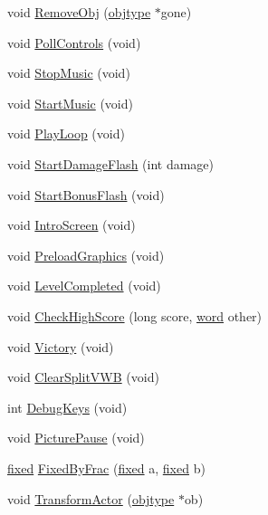 \begin{DoxyCompactItemize}
\item 
void \hyperlink{WL__DEF_8H_a2cf5a059e3bf9f094eb8427afbd49664}{RemoveObj} (\hyperlink{structobjstruct}{objtype} $\ast$gone)
\item 
void \hyperlink{WL__DEF_8H_a15ba9210e22ebca4139dd64d5ede0d05}{PollControls} (void)
\item 
void \hyperlink{WL__DEF_8H_a4f0b9aceb236c59d54712be5ace9e96e}{StopMusic} (void)
\item 
void \hyperlink{WL__DEF_8H_a3374c0ac5e4769e46cebf74f4180dca4}{StartMusic} (void)
\item 
void \hyperlink{WL__DEF_8H_a1093a19e7a1263f20a026e662db7121f}{PlayLoop} (void)
\item 
void \hyperlink{WL__DEF_8H_a9d82bd76126e466b5d9fa28eea3d00f1}{StartDamageFlash} (int damage)
\item 
void \hyperlink{WL__DEF_8H_a18616827acc24f2c2b1b9a77326bc024}{StartBonusFlash} (void)
\item 
void \hyperlink{WL__DEF_8H_a98260bc22d24f0075ec75a375a865b1d}{IntroScreen} (void)
\item 
void \hyperlink{WL__DEF_8H_a62b222f44bcc97cfca512fe6b24f4863}{PreloadGraphics} (void)
\item 
void \hyperlink{WL__DEF_8H_ab396c53c02f20e288d2d718c0ee64728}{LevelCompleted} (void)
\item 
void \hyperlink{WL__DEF_8H_ab41d5a4fd5a76f25d8773cff34929243}{CheckHighScore} (long score, \hyperlink{ID__HEAD_8H_abad51e07ab6d26bec9f1f786c8d65bcd}{word} other)
\item 
void \hyperlink{WL__DEF_8H_aaa41fd21f2b55e23622375ac43624b99}{Victory} (void)
\item 
void \hyperlink{WL__DEF_8H_a8805b889a7e1284ca6c88619137588d3}{ClearSplitVWB} (void)
\item 
int \hyperlink{WL__DEF_8H_ae61234b6d03ca70ebed1f5a423d17ba5}{DebugKeys} (void)
\item 
void \hyperlink{WL__DEF_8H_a98df47014d2079dafa7b7b0911bef3ff}{PicturePause} (void)
\item 
\hyperlink{WL__DEF_8H_aaf54715c9b83afe8794059fcf5fd5e7e}{fixed} \hyperlink{WL__DEF_8H_ac58e6db60be1fcbd21351db5a7ca8210}{FixedByFrac} (\hyperlink{WL__DEF_8H_aaf54715c9b83afe8794059fcf5fd5e7e}{fixed} a, \hyperlink{WL__DEF_8H_aaf54715c9b83afe8794059fcf5fd5e7e}{fixed} b)
\item 
void \hyperlink{WL__DEF_8H_a356d3c2c5bc5099f87ed2bb02e140214}{TransformActor} (\hyperlink{structobjstruct}{objtype} $\ast$ob)
\item 

\end{DoxyCompactItemize}
